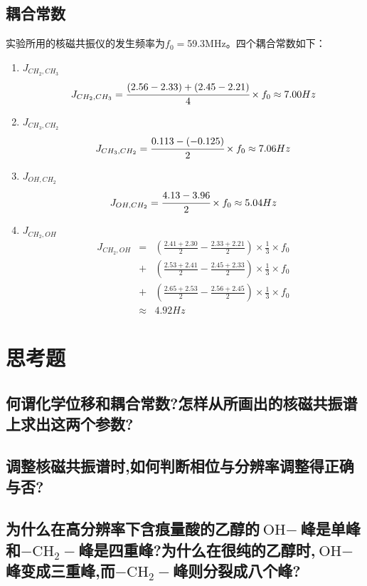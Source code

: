 \documentclass[a4paper]{article}
\begin{document}
\subsection{耦合常数}
实验所用的核磁共振仪的发生频率为$f_0 = $59.3MHz。四个耦合常数如下：
\begin{enumerate}
\item $J_{CH_2,CH_3}$\\
$$J_{CH_2,CH_3} = \cfrac{(2.56-2.33)+(2.45-2.21)}{4}\times f_0 \approx 7.00Hz$$
\item $J_{CH_3,CH_2}$\\
$$J_{CH_3,CH_2} = \cfrac{0.113 - (-0.125)}{2}\times f_0 \approx 7.06Hz$$
\item $J_{OH,CH_2}$\\
$$J_{OH,CH_2} = \cfrac{4.13 - 3.96}{2}\times f_0 \approx 5.04Hz$$
\item $J_{CH_2,OH}$\\
\begin{eqnarray*}
J_{CH_2,OH} &=&
   \left(\frac{2.41+2.30}{2} - \frac{2.33+2.21}{2}\right)\times\frac13\times f_0  \\
 &+& \left(\frac{2.53+2.41}{2} - \frac{2.45+2.33}{2}\right)\times\frac13\times f_0  \\
 &+& \left(\frac{2.65+2.53}{2} - \frac{2.56+2.45}{2}\right)\times\frac13\times f_0 \\
 &\approx& 4.92Hz
\end{eqnarray*}
\end{enumerate}

\section{思考题}
\subsection{何谓化学位移和耦合常数?怎样从所画出的核磁共振谱上求出这两个参数?}
\subsection{调整核磁共振谱时,如何判断相位与分辨率调整得正确与否?}
\subsection{为什么在高分辨率下含痕量酸的乙醇的$\text{OH}-$峰是单峰和$-\text{CH}_2-$峰是四重峰?为什么在很纯的乙醇时,$\text{OH}-$峰变成三重峰,而$-\text{CH}_2-$峰则分裂成八个峰?}

\nocite{jiaocai}

\end{document}
